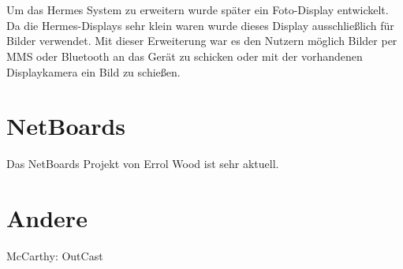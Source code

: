 \\
\\
Um das Hermes System zu erweitern wurde später ein Foto-Display entwickelt\cite{cheveres:2005:hermes-bluetooth}. Da die Hermes-Displays sehr klein waren wurde dieses Display ausschließlich für Bilder verwendet.
Mit dieser Erweiterung war es den Nutzern möglich Bilder per MMS oder Bluetooth an das Gerät zu schicken oder mit der vorhandenen Displaykamera ein Bild zu schießen.







\section{NetBoards}
Das NetBoards Projekt von Errol Wood\cite{wood:2014} ist sehr aktuell.
\cite{netboards:website}

\section{Andere}
McCarthy: OutCast\cite{mccarthy:2001}
% 
% 
